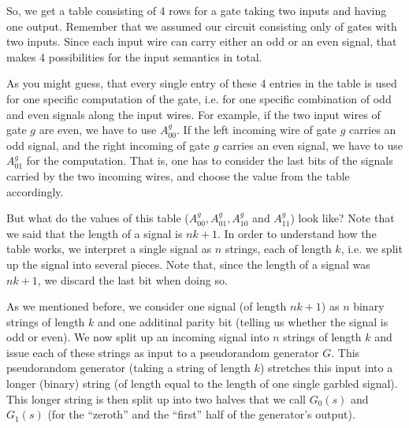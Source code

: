 \message{ !name(seminar.tex)}\documentclass{llncs}
\newcommand{\todo}[1]{ {\color{red}{\textbf{#1}}}}
\begin{document}
So, we get a table consisting of 4 rows for a gate taking two inputs and having one output. Remember that we assumed our circuit consisting only of gates with two inputs. Since each input wire can carry either an odd or an even signal, that makes 4 possibilities for the input semantics in total.

As you might guess, that every single entry of these 4 entries in the table is used for one specific computation of the gate, i.e. for one specific combination of odd and even signals along the input wires. For example, if the two input wires of gate $g$ are even, we have to use $A_{00}^g$. If the left incoming wire of gate $g$ carries an odd signal, and the right incoming of gate $g$ carries an even signal, we have to use $A_{01}^g$ for the computation. That is, one has to consider the last bits of the signals carried by the two incoming wires, and choose the value from the table accordingly.

But what do the values of this table ($A^g_{00},A^g_{01},A^g_{10}$ and $A^g_{11}$) look like? Note that we said that the length of a signal is $nk+1$. In order to understand how the table works, we interpret a single signal as $n$ strings, each of length $k$, i.e. we split up the signal into several pieces. Note that, since the length of a signal was $nk+1$, we discard the last bit when doing so.

As we mentioned before, we consider one signal (of length $nk+1$) as $n$ binary strings of length $k$ and one additinal parity bit (telling us whether the signal is odd or even). We now split up an incoming signal into $n$ strings of length $k$ and issue each of these strings as input to a pseudorandom generator $G$. This pseudorandom generator (taking a string of length $k$) stretches this input into a longer (binary) string (of length equal to the length of one single garbled signal). This longer string is then split up into two halves that we call $G_0(s)$ and $G_1(s)$ (for the ``zeroth'' and the ``first'' half of the generator's output).

\end{document}
